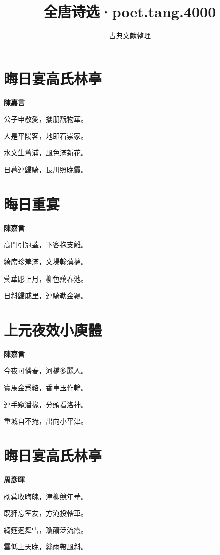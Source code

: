 \documentclass[12pt,a4paper]{ctexbook}
\title{全唐诗选·poet.tang.4000}
\author{古典文献整理}
\date{}
\begin{document}
\maketitle
\tableofcontents
\newpage
\section{晦日宴高氏林亭}
\textbf{陳嘉言}\par\vspace{0.5em}
公子申敬愛，攜朋翫物華。\par
人是平陽客，地即石崇家。\par
水文生舊浦，風色滿新花。\par
日暮連歸騎，長川照晚霞。\par

\section{晦日重宴}
\textbf{陳嘉言}\par\vspace{0.5em}
高門引冠蓋，下客抱支離。\par
綺席珍羞滿，文場翰藻摛。\par
蓂華彫上月，柳色藹春池。\par
日斜歸戚里，連騎勒金羈。\par

\section{上元夜效小庾體}
\textbf{陳嘉言}\par\vspace{0.5em}
今夜可憐春，河橋多麗人。\par
寶馬金爲絡，香車玉作輪。\par
連手窺潘掾，分頭看洛神。\par
重城自不掩，出向小平津。\par

\section{晦日宴高氏林亭}
\textbf{周彥暉}\par\vspace{0.5em}
砌蓂收晦魄，津柳競年華。\par
既狎忘筌友，方淹投轄車。\par
綺筵迴舞雪，瓊醑泛流霞。\par
雲低上天晚，絲雨帶風斜。\par
\end{document}

